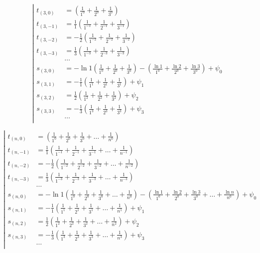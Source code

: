 \begin{equation*} \left| \begin{aligned}
t_{(3,0)} &=
  \left(
  \frac{1}{1^0}
+ \frac{1}{2^0}
+ \frac{1}{3^0} \right) \\
%
t_{(3,-1)} &=
  \frac{1}{1} \left(
  \frac{1}{1^{-1}}
+ \frac{1}{2^{-1}}
+ \frac{1}{3^{-1}} \right) \\
%
t_{(3,-2)} &=
- \frac{1}{2} \left(
  \frac{1}{1^{-2}}
+ \frac{1}{2^{-2}}
+ \frac{1}{3^{-2}} \right) \\
%
t_{(3,-3)} &=
  \frac{1}{3} \left(
  \frac{1}{1^{-3}}
+ \frac{1}{2^{-3}}
+ \frac{1}{3^{-3}} \right) \\
%
&\ldots \\
%
s_{(3,0)} &=
- \ln{1} \left(
  \frac{1}{1^0}
+ \frac{1}{2^0}
+ \frac{1}{3^0} \right)
- \left(
  \frac{\ln{1}}{1^0}
+ \frac{\ln{2}}{2^0}
+ \frac{\ln{3}}{3^0} \right)
+ \psi_0 \\
%
s_{(3,1)} &=
- \frac{1}{1} \left(
  \frac{1}{1^1}
+ \frac{1}{2^1}
+ \frac{1}{3^1} \right)
+ \psi_1 \\
%
s_{(3,2)} &=
  \frac{1}{2} \left(
  \frac{1}{1^2}
+ \frac{1}{2^2}
+ \frac{1}{3^2} \right)
+ \psi_2 \\
%
s_{(3,3)} &=
- \frac{1}{3} \left(
  \frac{1}{1^3}
+ \frac{1}{2^3}
+ \frac{1}{3^3} \right)
+ \psi_3 \\
%
&\ldots \\
\end{aligned} \right. \end{equation*}

\begin{equation*} \left| \begin{aligned}
t_{(n,0)} &=
  \left(
  \frac{1}{1^0}
+ \frac{1}{2^0}
+ \frac{1}{3^0}
+ \ldots
+ \frac{1}{n^0} \right) \\
%
t_{(n,-1)} &=
  \frac{1}{1} \left(
  \frac{1}{1^{-1}}
+ \frac{1}{2^{-1}}
+ \frac{1}{3^{-1}}
+ \ldots
+ \frac{1}{n^{-1}} \right) \\
%
t_{(n,-2)} &=
- \frac{1}{2} \left(
  \frac{1}{1^{-2}}
+ \frac{1}{2^{-2}}
+ \frac{1}{3^{-2}}
+ \ldots
+ \frac{1}{n^{-2}} \right) \\
%
t_{(n,-3)} &=
  \frac{1}{3} \left(
  \frac{1}{1^{-3}}
+ \frac{1}{2^{-3}}
+ \frac{1}{3^{-3}}
+ \ldots
+ \frac{1}{n^{-3}} \right) \\
%
&\ldots \\
%
s_{(n,0)} &=
- \ln{1} \left(
  \frac{1}{1^0}
+ \frac{1}{2^0}
+ \frac{1}{3^0}
+ \ldots
+ \frac{1}{n^0} \right)
- \left(
  \frac{\ln{1}}{1^0}
+ \frac{\ln{2}}{2^0}
+ \frac{\ln{3}}{3^0}
+ \ldots
+ \frac{\ln{n}}{n^0} \right)
+ \psi_0 \\
%
s_{(n,1)} &=
- \frac{1}{1} \left(
  \frac{1}{1^1}
+ \frac{1}{2^1}
+ \frac{1}{3^1}
+ \ldots
+ \frac{1}{n^1} \right)
+ \psi_1 \\
%
s_{(n,2)} &=
  \frac{1}{2} \left(
  \frac{1}{1^2}
+ \frac{1}{2^2}
+ \frac{1}{3^2}
+ \ldots
+ \frac{1}{n^2} \right)
+ \psi_2 \\
%
s_{(n,3)} &=
- \frac{1}{3} \left(
  \frac{1}{1^3}
+ \frac{1}{2^3}
+ \frac{1}{3^3}
+ \ldots
+ \frac{1}{n^3} \right)
+ \psi_3 \\
%
&\ldots \\
\end{aligned} \right. \end{equation*}